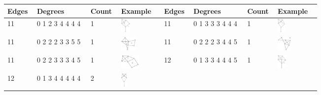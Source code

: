 \clearpage

\begin{footnotesize}
\begin{longtable}{
        m{0.05\linewidth} m{0.15\linewidth} m{0.05\linewidth} m{0.12\linewidth} |
        m{0.05\linewidth} m{0.15\linewidth} m{0.05\linewidth} m{0.12\linewidth}
    }
\toprule
Edges & Degrees & Count & Example &     Edges & Degrees & Count & Example\\ [0.5ex]
\midrule
11 & 0 1 2 3 4 4 4 4 & 1 & \includegraphics[height=0.7151cm]{15-universal-graphs/img/degree-sequences-example-graphs/graph-4-8-0} &
11 & 0 1 3 3 3 4 4 4 & 1 & \includegraphics[height=0.7151cm]{15-universal-graphs/img/degree-sequences-example-graphs/graph-4-8-1}\\
11 & 0 2 2 2 3 3 5 5 & 1 & \includegraphics[height=0.7151cm]{15-universal-graphs/img/degree-sequences-example-graphs/graph-4-8-2} &
11 & 0 2 2 2 3 4 4 5 & 1 & \includegraphics[height=0.7151cm]{15-universal-graphs/img/degree-sequences-example-graphs/graph-4-8-3}\\
11 & 0 2 2 3 3 3 4 5 & 1 & \includegraphics[height=0.7151cm]{15-universal-graphs/img/degree-sequences-example-graphs/graph-4-8-4} &
12 & 0 1 3 3 4 4 4 5 & 1 & \includegraphics[height=0.7151cm]{15-universal-graphs/img/degree-sequences-example-graphs/graph-4-8-5}\\
12 & 0 1 3 4 4 4 4 4 & 2 & \includegraphics[height=0.7151cm]{15-universal-graphs/img/degree-sequences-example-graphs/graph-4-8-6} &

\end{longtable}
\end{footnotesize}
